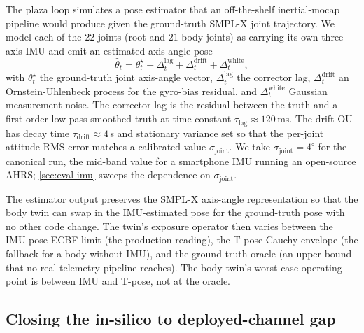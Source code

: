 \documentclass[journal,twocolumn,10pt]{IEEEtran}
\theoremstyle{plain}
\theoremstyle{remark}
\begin{document}
The plaza loop simulates a pose estimator that an off-the-shelf
inertial-mocap pipeline would produce given the ground-truth
SMPL-X joint trajectory. We model each of the $22$ joints (root and
$21$ body joints) as carrying its own three-axis IMU and emit an
estimated axis-angle pose
\begin{equation}\label{eq:imu-pose}
  \hat\theta_t = \theta^\star_t + \Delta_t^{\mathrm{lag}}
  + \Delta_t^{\mathrm{drift}} + \Delta_t^{\mathrm{white}},
\end{equation}
with $\theta^\star_t$ the ground-truth joint axis-angle vector,
$\Delta_t^{\mathrm{lag}}$ the corrector lag, $\Delta_t^{\mathrm{drift}}$
an Ornstein-Uhlenbeck process for the gyro-bias residual, and
$\Delta_t^{\mathrm{white}}$ Gaussian measurement noise. The
corrector lag is the residual between the truth and a first-order
low-pass smoothed truth at time constant $\tau_{\mathrm{lag}} \approx
120\,$ms. The drift OU has decay time $\tau_{\mathrm{drift}} \approx
4\,$s and stationary variance set so that the per-joint attitude
RMS error matches a calibrated value $\sigma_{\mathrm{joint}}$. We
take $\sigma_{\mathrm{joint}} = 4^\circ$ for the canonical run, the
mid-band value for a smartphone IMU running an open-source AHRS;
\cref{sec:eval-imu} sweeps the dependence on $\sigma_{\mathrm{joint}}$.

The estimator output preserves the SMPL-X axis-angle representation
so that the body twin can swap in the IMU-estimated pose for the
ground-truth pose with no other code change. The
twin's exposure operator then varies between the IMU-pose ECBF
limit (the production reading), the T-pose Cauchy envelope (the
fallback for a body without IMU), and the ground-truth
oracle (an upper bound that no real telemetry pipeline reaches).
The body twin's worst-case operating point is between IMU and
T-pose, not at the oracle.

\subsection{Closing the in-silico to deployed-channel gap}\label{sec:csi-cal}
\end{document}
